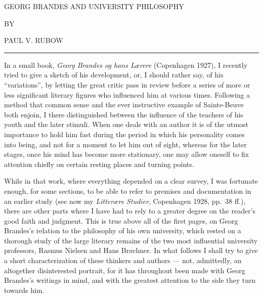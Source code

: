 \documentclass[12pt,a4paper,openany]{book}
\newcommand{\opage}[1]{\marginnote{\footnotesize\textit{[#1]}}}
\begin{document}
\opage{145}\setcounter{footnote}{0}%

\begin{center}GEORG BRANDES AND UNIVERSITY PHILOSOPHY\end{center}

\begin{center}BY\end{center}

\begin{center}PAUL V. RUBOW\end{center}

\begin{center}\rule{3em}{0.4pt}\end{center}

In a small book, \textit{Georg Brandes og hans Lærere} (Copenhagen 1927), I recently tried to give a sketch of his
development, or, I should rather say, of his ``variations'', by letting the great critic pass in review before a
series of more or less significant literary figures who influenced him at various times. Following a method that
common sense and the ever instructive example of Sainte-Beuve both enjoin, I there distinguished between the
influence of the teachers of his youth and the later stimuli. When one deals with an author it is of the utmost
importance to hold him fast during the period in which his personality comes into being, and not for a moment to
let him out of sight, whereas for the later stages, once his mind has become more stationary, one may allow
oneself to fix attention chiefly on certain resting places and turning points.

While in that work, where everything depended on a clear survey, I was fortunate enough, for some sections, to be
able to refer to premises and documentation in an earlier study (see now my \textit{Litterære Studier}, Copenhagen
1928, pp.~38 ff.), there are other parts where I have had to rely to a greater degree on the reader's good faith and
judgment. This is true above all of the first pages, on Georg Brandes's relation to the philosophy of his own
university, which rested on a thorough study of the large literary remains of the two most influential university
professors, Rasmus Nielsen and Hans Brøchner. In what follows I shall try to give a short characterization of
these thinkers and authors --- not, admittedly, an altogether disinterested portrait, for it has throughout been
made with Georg Brandes's writings in mind, and with the greatest attention to the side they turn towards him.
\end{document}
